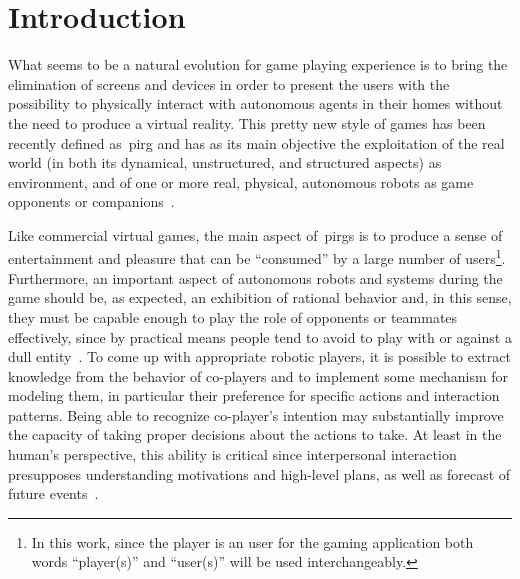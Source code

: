 \chapter{Introduction}

What seems to be a natural evolution for game playing experience %
is to bring the elimination of screens and devices in order to present the users with the possibility to physically interact with autonomous agents in their homes without the need to produce a virtual reality. This pretty new style of games has been recently defined as~\gls{pirg} and has as its main objective the exploitation of the real world (in both its dynamical, unstructured, and structured aspects) as environment, and of one or more real, physical, autonomous robots as game opponents or companions~\citep{martinoia_physically_2013}.

Like commercial virtual games, the main aspect of~\gls{pirg}s is to produce a sense of entertainment and pleasure that can be ``consumed'' by a large number of users\footnote{In this work, since the player is an user for the gaming application both words ``player(s)'' and ``user(s)'' will be used interchangeably.}. Furthermore, an important aspect of autonomous robots and systems during the game should be, as expected, an exhibition of rational behavior and, in this sense, they must be capable enough to play the role of opponents or teammates effectively, since by practical means people tend to avoid to play with or against a dull entity~\citep{martinoia_physically_2013}.
To come up with appropriate robotic players, it is possible to extract knowledge from the behavior of co-players and to implement some mechanism for modeling them, in particular their preference for specific actions and interaction patterns. %
Being able to recognize co-player's intention may substantially improve the capacity of taking proper decisions about the actions to take. At least in the human's perspective, this ability is critical since interpersonal interaction presupposes understanding  motivations and high-level plans, as well as forecast of future events~\citep{sukthankar_plan_2014}.

